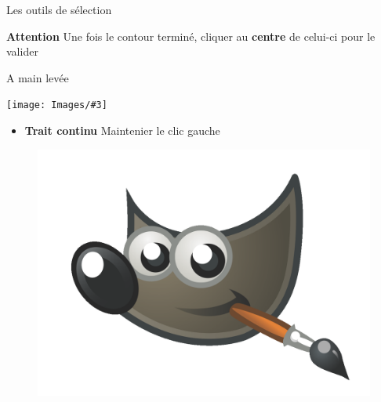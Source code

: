 \documentclass[10pt,svgnames,usenames,table]{beamer}
\newcommand{\tool}[3]{%
	\begin{minipage}{0.40\textwidth}
	\item #1	
	\end{minipage}\hfill
	\begin{minipage}{0.20\textwidth}
	\begin{flushright}
	\keys{#2}
	\end{flushright}
	\end{minipage}
	\begin{minipage}{0.06\textwidth}
	\fbox{ou}
	\end{minipage}
	\begin{minipage}{0.1\textwidth}
	\texttt{[image: Images/\#3]}
	\end{minipage}
}
\begin{document}
\begin{frame}[allowframebreaks]{Les outils de sélection}
\begin{enumerate}
	\vspace{0.4cm}
	\textbf{Attention} Une fois le contour terminé, cliquer au \textbf{centre} de celui-ci pour le valider
	
	\framebreak
	
	\tool{A main levée}{F}{freeSelect.png}

	\begin{itemize}
		\item \textbf{Trait continu} Maintenier le clic gauche 
	\end{itemize}
	
		\begin{minipage}{0.45\textwidth}
		\begin{figure}
        		\centering
        		\includegraphics[width=\textwidth]{Images/gimp-logo.png} 
		\end{figure}
		\end{minipage}\hfill
		\begin{minipage}{0.45\textwidth}
		\begin{figure}
        		\centering

\end{figure}
\end{minipage}
\end{enumerate}
\end{frame}
\end{document}
